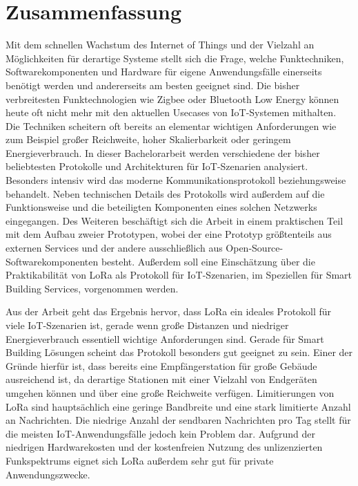 \section*{Zusammenfassung}
\label{sec:Zusammenfassung}

Mit dem schnellen Wachstum des Internet of Things und der Vielzahl an Möglichkeiten für derartige Systeme stellt sich die Frage, welche Funktechniken, Software\-komponenten und Hardware für eigene Anwendungsfälle einerseits benötigt werden und andererseits am besten geeignet sind. Die bisher verbreitesten Funktechnologien wie Zigbee oder Bluetooth Low Energy können heute oft nicht mehr mit den aktuellen Usecases von IoT-Systemen mithalten. Die Techniken scheitern oft bereits an elementar wichtigen Anforderungen wie zum Beispiel großer Reich\-weite, hoher Skalierbarkeit oder geringem Energieverbrauch. In dieser Bachelorarbeit werden verschiedene der bisher beliebtesten Protokolle und Architekturen für IoT-Szenarien analysiert. Besonders intensiv wird das moderne Kommunikationsprotokoll  beziehungsweise  behandelt. Neben technischen Details des Protokolls wird außerdem auf die Funktionsweise und die beteiligten Komponenten eines solchen Netzwerks eingegangen. Des Weiteren beschäftigt sich die Arbeit in einem praktischen Teil mit dem Aufbau zweier Prototypen, wobei der eine Prototyp größtenteils aus externen Services und der andere ausschließlich aus Open-Source-Softwarekomponenten besteht. Außerdem soll eine Einschätzung über die Praktikabilität von LoRa als Protokoll für IoT-Szenarien, im Speziellen für Smart Building Services, vorgenommen werden.

Aus der Arbeit geht das Ergebnis hervor, dass LoRa ein ideales Protokoll für viele IoT-Szenarien ist, gerade wenn große Distanzen und niedriger Energieverbrauch essentiell wichtige Anforderungen sind. Gerade für Smart Building Lösungen scheint das Protokoll besonders gut geeignet zu sein. Einer der Gründe hierfür ist, dass bereits eine Empfängerstation für große Gebäude ausreichend ist, da derartige Stationen mit einer Vielzahl von Endgeräten umgehen können und über eine große Reichweite verfügen. Limitierungen von LoRa sind hauptsächlich eine geringe Bandbreite und eine stark limitierte Anzahl an Nachrichten. Die niedrige Anzahl der sendbaren Nachrichten pro Tag stellt für die meisten IoT-Anwendungsfälle jedoch kein Problem dar. Aufgrund der niedrigen Hardwarekosten und der kostenfreien Nutzung des unlizenzierten Funkspektrums eignet sich LoRa außerdem sehr gut für private Anwendungszwecke.